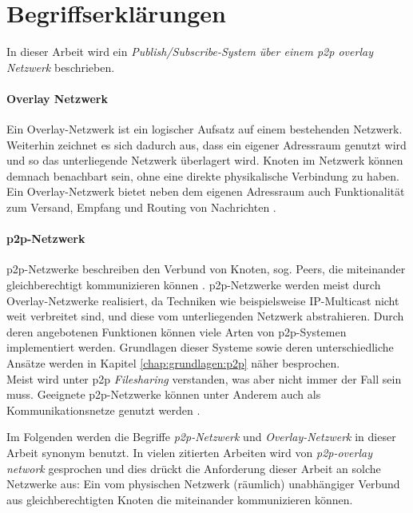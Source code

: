 \section{Begriffserklärungen}
In dieser Arbeit wird ein \emph{Publish/Subscribe-System über einem \ac{p2p} overlay Netzwerk} beschrieben.


\paragraph{Overlay Netzwerk} Ein Overlay-Netzwerk ist ein logischer Aufsatz auf einem bestehenden Netzwerk. Weiterhin zeichnet es sich dadurch aus, dass ein eigener Adressraum genutzt wird und so das unterliegende Netzwerk überlagert wird. Knoten im Netzwerk können demnach benachbart sein, ohne eine direkte physikalische Verbindung zu haben. Ein Overlay-Netzwerk bietet neben dem eigenen Adressraum auch Funktionalität zum Versand, Empfang und Routing von Nachrichten \cite{Tannenbaum2003}. 

\paragraph{\ac{p2p}-Netzwerk} p2p-Netzwerke beschreiben den Verbund von Knoten, sog. Peers, die miteinander gleichberechtigt kommunizieren können \cite{Steinmetz2005}. p2p-Netzwerke werden meist durch Overlay-Netzwerke realisiert, da Techniken wie beispielsweise IP-Multicast \cite{Deering1990Multicast} nicht weit verbreitet sind, und diese vom unterliegenden Netzwerk abstrahieren. Durch deren angebotenen Funktionen können viele Arten von p2p-Systemen implementiert werden. Grundlagen dieser Systeme sowie deren unterschiedliche Ansätze werden in Kapitel \ref{chap:grundlagen:p2p} näher besprochen.\\
Meist wird unter p2p \emph{Filesharing} verstanden, was aber nicht immer der Fall sein muss. Geeignete p2p-Netzwerke können unter Anderem auch als Kommunikationsnetze genutzt werden \cite{Darlagiannis2006Peertopeer}.

Im Folgenden werden die Begriffe \emph{p2p-Netzwerk} und \emph{Overlay-Netzwerk} in dieser Arbeit synonym benutzt. In vielen zitierten Arbeiten wird von \emph{p2p-overlay network} gesprochen und dies drückt die Anforderung dieser Arbeit an solche Netzwerke aus: Ein vom physischen Netzwerk (räumlich) unabhängiger Verbund aus gleichberechtigten Knoten die miteinander kommunizieren können.

